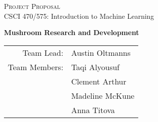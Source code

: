 \documentclass[11pt, a4paper]{article}
\begin{document}
    \begin{titlepage}
        \begin{center}
            \vspace*{2in}
            {\Large \textsc{Project Proposal}}\\
            \vspace*{0.1in}
            CSCI 470/575: Introduction to Machine Learning\\
            \vspace*{0.1in}
            \date{\today}
            
            \vspace*{3in}
            \large{\textbf{Mushroom Research and Development}} \\
            \vspace*{0.1in}
\begin{table}[h!]
\centering
\begin{tabular}{ll}
\multicolumn{1}{r}{\large{Team Lead:}}   & \large{Austin Oltmanns} \\
\multicolumn{1}{r}{\large{Team Members:}} & \large{Taqi Alyousuf}            \\
             & \large{Clement Arthur}            \\
             & \large{Madeline McKune}             \\
             & \large{Anna Titova}          
\end{tabular}
\end{table}
        \end{center}


    \end{titlepage}
    
\end{document}
